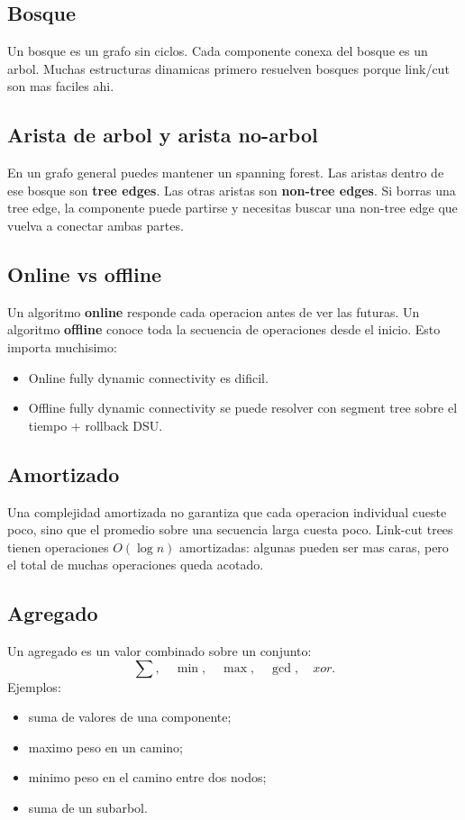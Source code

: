 \documentclass[10pt]{article}
\newcommand{\bigO}{O}
\begin{document}
\subsection{Bosque}
Un bosque es un grafo sin ciclos. Cada componente conexa del bosque es un arbol.
Muchas estructuras dinamicas primero resuelven bosques porque link/cut son mas
faciles ahi.

\subsection{Arista de arbol y arista no-arbol}
En un grafo general puedes mantener un spanning forest. Las aristas dentro de
ese bosque son \textbf{tree edges}. Las otras aristas son \textbf{non-tree
edges}. Si borras una tree edge, la componente puede partirse y necesitas buscar
una non-tree edge que vuelva a conectar ambas partes.

\subsection{Online vs offline}
Un algoritmo \textbf{online} responde cada operacion antes de ver las futuras.
Un algoritmo \textbf{offline} conoce toda la secuencia de operaciones desde el
inicio. Esto importa muchisimo:
\begin{itemize}[leftmargin=*]
\item Online fully dynamic connectivity es dificil.
\item Offline fully dynamic connectivity se puede resolver con segment tree
sobre el tiempo + rollback DSU.
\end{itemize}

\subsection{Amortizado}
Una complejidad amortizada no garantiza que cada operacion individual cueste
poco, sino que el promedio sobre una secuencia larga cuesta poco. Link-cut trees
tienen operaciones $\bigO(\log n)$ amortizadas: algunas pueden ser mas caras,
pero el total de muchas operaciones queda acotado.

\subsection{Agregado}
Un agregado es un valor combinado sobre un conjunto:
\[
\sum,\quad \min,\quad \max,\quad \gcd,\quad xor.
\]
Ejemplos:
\begin{itemize}[leftmargin=*]
\item suma de valores de una componente;
\item maximo peso en un camino;
\item minimo peso en el camino entre dos nodos;
\item suma de un subarbol.
\end{itemize}
\end{document}
